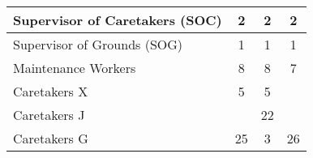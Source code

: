 \begin{tabular}{l|c|c|c|}
        \multicolumn{1}{|l|}{\cellcolor{ccfuschialight}Supervisor of Caretakers (SOC)} & 2                                                      & 2                                                                & 2                                                      \\ \hline
        \multicolumn{1}{|l|}{\cellcolor{ccfuschialight}Supervisor of Grounds (SOG)}    & 1                                                      & 1                                                                & 1                                                      \\ \hline
        \multicolumn{1}{|l|}{\cellcolor{ccfuschialight}Maintenance Workers}            & 8                                                      & 8                                                                & 7                                                       \\ \hline
        \multicolumn{1}{|l|}{\cellcolor{ccfuschialight}Caretakers X}                   & 5                                                      & 5                                                                &                                                       \\ \cline{1-3}
        \multicolumn{1}{|l|}{\cellcolor{ccfuschialight}Caretakers J\tnote{2}}                   &                                                       & 22                                                                &                                                         \\ \cline{1-1} \cline{3-3}
        \multicolumn{1}{|l|}{\cellcolor{ccfuschialight}Caretakers G}                   & \multirow{-2}{*}{25}                                                      & 3                                     & \multirow{-3}{*}{26 \tnote{3}}                           \\ \hline
        \end{tabular}
        
        